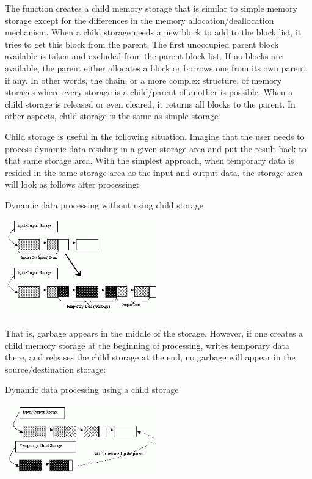 The function creates a child memory
storage that is similar to simple memory storage except for the
differences in the memory allocation/deallocation mechanism. When a
child storage needs a new block to add to the block list, it tries
to get this block from the parent. The first unoccupied parent block
available is taken and excluded from the parent block list. If no blocks
are available, the parent either allocates a block or borrows one from
its own parent, if any. In other words, the chain, or a more complex
structure, of memory storages where every storage is a child/parent of
another is possible. When a child storage is released or even cleared,
it returns all blocks to the parent. In other aspects, child storage
is the same as simple storage.

Child storage is useful in the following situation. Imagine
that the user needs to process dynamic data residing in a given storage area and
put the result back to that same storage area. With the simplest approach,
when temporary data is resided in the same storage area as the input and
output data, the storage area will look as follows after processing:

Dynamic data processing without using child storage

\includegraphics[width=0.5\textwidth]{pics/memstorage1.png}

That is, garbage appears in the middle of the storage. However, if
one creates a child memory storage at the beginning of processing,
writes temporary data there, and releases the child storage at the end,
no garbage will appear in the source/destination storage:

Dynamic data processing using a child storage

\includegraphics[width=0.5\textwidth]{pics/memstorage2.png}

